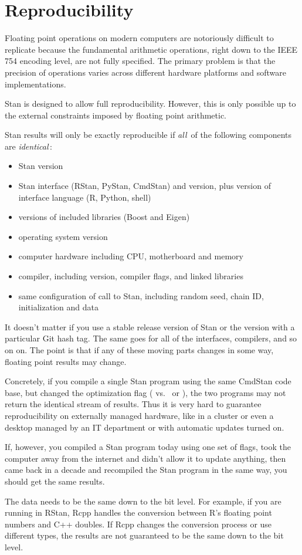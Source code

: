 \chapter{Reproducibility}\label{reproducibility.chapter}

\noindent
Floating point operations on modern computers are notoriously
difficult to replicate because the fundamental arithmetic operations,
right down to the IEEE 754 encoding level, are not fully specified.
The primary problem is that the precision of operations varies across
different hardware platforms and software implementations.

Stan is designed to allow full reproducibility.  However, this is only
possible up to the external constraints imposed by floating point
arithmetic.

Stan results will only be exactly reproducible if {\it all}\, of the following
components are {\it identical}\,:
%
\begin{itemize}
\item Stan version
\item Stan interface (RStan, PyStan, CmdStan) and version, plus version
  of interface language (R, Python, shell)
\item versions of included libraries (Boost and Eigen)
\item operating system version
\item computer hardware including CPU, motherboard and memory
\item \Cpp compiler, including version, compiler flags, and linked libraries
\item same configuration of call to Stan, including random seed, chain
  ID, initialization and data
\end{itemize}
%
It doesn't matter if you use a stable release version of Stan or the
version with a particular Git hash tag.  The same goes for all of the
interfaces, compilers, and so on on.  The point is that if any of
these moving parts changes in some way, floating point results may
change.

Concretely, if you compile a single Stan program using the same
CmdStan code base, but changed the optimization flag ( vs.\
 or ), the two programs may not return the identical
stream of results.  Thus it is very hard to guarantee reproducibility
on externally managed hardware, like in a cluster or even a desktop
managed by an IT department or with automatic updates turned on.

If, however, you compiled a Stan program today using one set of flags,
took the computer away from the internet and didn't allow it to update
anything, then came back in a decade and recompiled the Stan program
in the same way, you should get the same results.

The data needs to be the same down to the bit level. For example, if
you are running in RStan, Rcpp handles the conversion between R's
floating point numbers and C++ doubles. If Rcpp changes the conversion
process or use different types, the results are not guaranteed to be
the same down to the bit level.  
